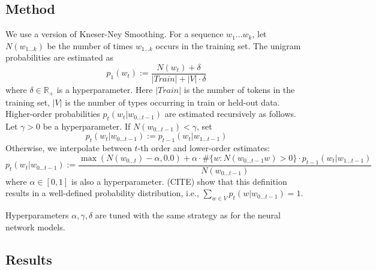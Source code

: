 
\subsection{Method}
We use a version of Kneser-Ney Smoothing.
For a sequence $w_1\dots w_k$, let $N(w_{1\dots k})$ be the number of times $w_{1\dots k}$ occurs in the training set.
The unigram probabilities are estimated as
\begin{equation}
	p_1(w_t) :=   \frac{N(w_t) + \delta}{|Train| + |V| \cdot \delta}
\end{equation}
where $\delta \in \mathbb{R}_+$ is a hyperparameter.
Here $|Train|$ is the number of tokens in the training set, $|V|$ is the number of types occurring in train or held-out data.
Higher-order probabilities $p_t(w_t|w_{0 \dots t-1})$ are estimated recursively as follows.
Let $\gamma > 0$ be a hyperparameter.
If $N(w_{0 \dots t-1}) < \gamma$, set
\begin{equation}
	p_t(w_t|w_{0 \dots t-1}) := p_{t-1}(w_t|w_{1\dots t-1})
\end{equation}
Otherwise, we interpolate between $t$-th order and lower-order estimates:
\begin{equation}
	p_t(w_t|w_{0 \dots t-1}) :=  \frac{\operatorname{max}(N(w_{0\dots t}) - \alpha, 0.0) + \alpha \cdot \#\{w : N(w_{0 \dots t-1}w) > 0\} \cdot p_{t-1}(w_t|w_{1\dots t-1})}{N(w_{0\dots t-1})}
\end{equation}
where $\alpha \in [0,1]$ is also a hyperparameter.
(CITE) show that this definition results in a well-defined probability distribution, i.e., $\sum_{w \in V} p_t(w|w_{0 \dots t-1}) = 1$.

%
%
%
%


Hyperparameters $\alpha, \gamma, \delta$ are tuned with the same strategy as for the neural network models.


\subsection{Results}



